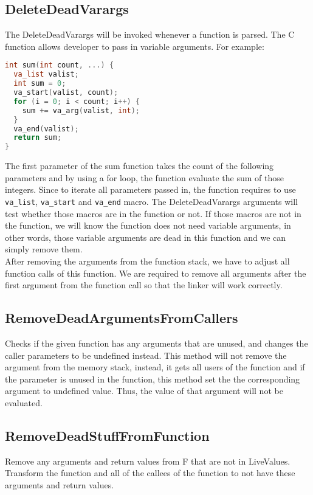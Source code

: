 \subsection{DeleteDeadVarargs}
The DeleteDeadVarargs will be invoked whenever a function is parsed. The C function allows developer to pass in variable arguments. For example:
\begin{lstlisting}[language=c]
int sum(int count, ...) {
  va_list valist;
  int sum = 0;
  va_start(valist, count);
  for (i = 0; i < count; i++) {
    sum += va_arg(valist, int);
  }
  va_end(valist);
  return sum;
}
\end{lstlisting}
The first parameter of the sum function takes the count of the following parameters and by using a for loop, the function evaluate the sum of those integers. Since to iterate all parameters passed in, the function requires to use \texttt{va\_list}, \texttt{va\_start} and \texttt{va\_end} macro. The DeleteDeadVarargs arguments will test whether those macros are in the function or not. If those macros are not in the function, we will know the function does not need variable arguments, in other words, those variable arguments are dead in this function and we can simply remove them. \\
After removing the arguments from the function stack, we have to adjust all function calls of this function. We are required to remove all arguments after the first argument from the function call so that the linker will work correctly.

\subsection{RemoveDeadArgumentsFromCallers}
Checks if the given function has any arguments that are unused, and changes the caller parameters to be undefined instead. This method will not remove the argument from the memory stack, instead, it gets all users of the function and if the parameter is unused in the function, this method set the the corresponding argument to undefined value. Thus, the value of that argument will not be evaluated.

\subsection{RemoveDeadStuffFromFunction}
Remove any arguments and return values from F that are not in LiveValues. Transform the function and all of the callees of the function to not have these arguments and return values.

